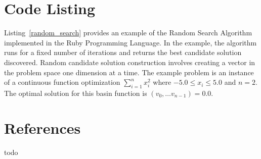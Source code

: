 \documentclass[a4paper, 11pt]{article}
\begin{document}
\section{Code Listing}
\label{sec:code}
Listing~\ref{random_search} provides an example of the Random Search Algorithm implemented in the Ruby Programming Language. 
In the example, the algorithm runs for a fixed number of iterations and returns the best candidate solution discovered. Random candidate solution construction involves creating a vector in the problem space one dimension at a time.
The example problem is an instance of a continuous function optimization $\sum_{i=1}^n x_{i}^2$ where $-5.0\leq x_i \leq 5.0$ and $n=2$. The optimal solution for this basin function is $(v_0,\ldots v_{n-1})=0.0$.



\section{References}
\label{sec:references}
todo
\end{document}
